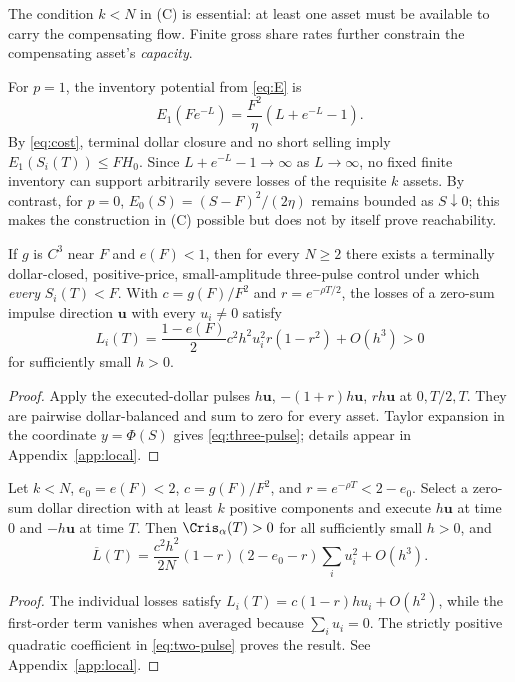 \documentclass[review,hidelinks,onefignum,onetabnum]{siamonline250211}
\begin{document}
The condition $k<N$ in (C) is essential: at least one asset must be available to carry the compensating flow. Finite gross share rates further constrain the compensating asset's \emph{capacity}.

For $p=1$, the inventory potential from \eqref{eq:E} is
\begin{equation}\label{eq:inventoryb}
E_1(Fe^{-L})=\frac{F^2}{\eta}\left(L+e^{-L}-1\right).
\end{equation}
By \eqref{eq:cost}, terminal dollar closure and no short selling imply $E_1(S_i(T))\le FH_0$. Since $L+e^{-L}-1\to\infty$ as $L\to\infty$, no fixed finite inventory can support arbitrarily severe losses of the requisite $k$ assets. By contrast, for $p=0$, $E_0(S)=(S-F)^2/(2\eta)$ remains bounded as $S\downarrow0$; this makes the construction in (C) possible but does not by itself prove reachability.

\begin{proposition}\label{prop:three-pulse}
If $g$ is $C^3$ near $F$ and $e(F)<1$, then for every $N\ge2$ there exists a terminally dollar-closed, positive-price, small-amplitude three-pulse control under which \emph{every} $S_i(T)<F$. With $c=g(F)/F^2$ and $r=e^{-\rho T/2}$, the losses of a zero-sum impulse direction $\bm u$ with every $u_i\ne0$ satisfy
\begin{equation}\label{eq:three-pulse}
L_i(T)=\frac{1-e(F)}2c^2h^2u_i^2r(1-r^2)+O(h^3)>0
\end{equation}
for sufficiently small $h>0$.
\end{proposition}
\begin{proof}
Apply the executed-dollar pulses $h\bm u$, $-(1+r)h\bm u$, $rh\bm u$ at $0,T/2,T$. They are pairwise dollar-balanced and sum to zero for every asset. Taylor expansion in the coordinate $y=\Phi(S)$ gives \eqref{eq:three-pulse}; details appear in Appendix~\ref{app:local}.
\end{proof}

\begin{proposition}\label{prop:two-pulse}
Let $k<N$, $e_0=e(F)<2$, $c=g(F)/F^2$, and $r=e^{-\rho T}<2-e_0$. Select a zero-sum dollar direction with at least $k$ positive components and execute $h\bm u$ at time $0$ and $-h\bm u$ at time $T$. Then $\Cris_\alpha(T)>0$ for all sufficiently small $h>0$, and
\begin{equation}\label{eq:two-pulse}
\overline L(T)=\frac{c^2h^2}{2N}(1-r)(2-e_0-r)\sum_iu_i^2+O(h^3).
\end{equation}
\end{proposition}
\begin{proof}
The individual losses satisfy $L_i(T)=c(1-r)hu_i+O(h^2)$, while the first-order term vanishes when averaged because $\sum_i u_i=0$. The strictly positive quadratic coefficient in \eqref{eq:two-pulse} proves the result. See Appendix~\ref{app:local}.
\end{proof}
\end{document}
